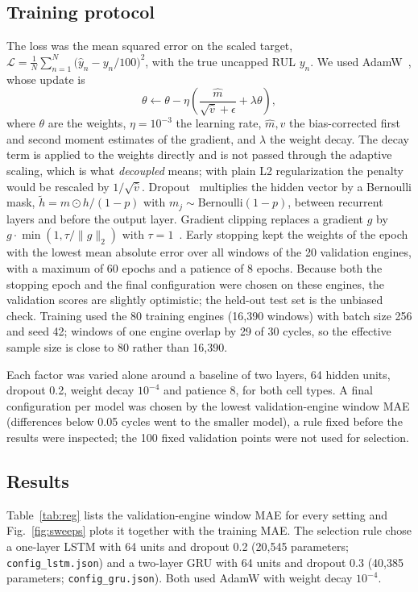 \subsection{Training protocol}
The loss was the mean squared error on the scaled target,
$\mathcal{L}=\frac{1}{N}\sum_{n=1}^{N}\big(\hat y_n-y_n/100\big)^2$, with the true uncapped RUL $y_n$.  We used AdamW~\cite{loshchilov_2019_adamw}, whose update is
\begin{equation}
\theta\leftarrow\theta-\eta\left(\frac{\hat m}{\sqrt{\hat v}+\epsilon}+\lambda\theta\right),
\end{equation}
where $\theta$ are the weights, $\eta=10^{-3}$ the learning rate, $\hat m,\hat v$ the bias-corrected first and second moment estimates of the gradient, and $\lambda$ the weight decay.  The decay term is applied to the weights directly and is not passed through the adaptive scaling, which is what \emph{decoupled} means; with plain L2 regularization the penalty would be rescaled by $1/\sqrt{\hat v}$.  Dropout~\cite{srivastava_2014_dropout} multiplies the hidden vector by a Bernoulli mask, $\tilde h=m\odot h/(1-p)$ with $m_j\sim\mathrm{Bernoulli}(1-p)$, between recurrent layers and before the output layer.  Gradient clipping replaces a gradient $g$ by $g\cdot\min(1,\tau/\lVert g\rVert_2)$ with $\tau=1$~\cite{pascanu_2013_difficulty}.  Early stopping kept the weights of the epoch with the lowest mean absolute error over all windows of the 20 validation engines, with a maximum of 60 epochs and a patience of 8 epochs.  Because both the stopping epoch and the final configuration were chosen on these engines, the validation scores are slightly optimistic; the held-out test set is the unbiased check.  Training used the 80 training engines (16,390 windows) with batch size 256 and seed 42; windows of one engine overlap by 29 of 30 cycles, so the effective sample size is close to 80 rather than 16,390.

Each factor was varied alone around a baseline of two layers, 64 hidden units, dropout 0.2, weight decay $10^{-4}$ and patience 8, for both cell types.  A final configuration per model was chosen by the lowest validation-engine window MAE (differences below 0.05 cycles went to the smaller model), a rule fixed before the results were inspected; the 100 fixed validation points were not used for selection.

\subsection{Results}
Table~\ref{tab:reg} lists the validation-engine window MAE for every setting and Fig.~\ref{fig:sweeps} plots it together with the training MAE.  The selection rule chose a one-layer LSTM with 64 units and dropout 0.2 (20,545 parameters; \texttt{config\_lstm.json}) and a two-layer GRU with 64 units and dropout 0.3 (40,385 parameters; \texttt{config\_gru.json}).  Both used AdamW with weight decay $10^{-4}$.

